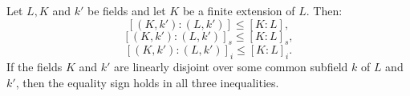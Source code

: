 Let $L, K$ and $k'$ be fields and let $K$ be a finite extension of $L$. Then:
$$[(K, k') : (L, k')] \leq [K : L],$$
$$[(K, k') : (L, k')]_s \leq [K : L]_s,$$
$$[(K, k') : (L, k')]_i \leq [K : L]_i.$$
If the fields $K$ and $k'$ are linearly disjoint over some common subfield $k$ of $L$ and $k'$, then the equality sign holds in all three inequalities.

